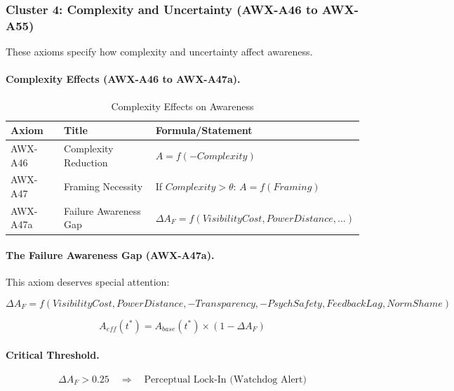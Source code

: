 \subsubsection{Cluster 4: Complexity and Uncertainty (AWX-A46 to AWX-A55)}

These axioms specify how complexity and uncertainty affect awareness.

\paragraph{Complexity Effects (AWX-A46 to AWX-A47a).}

\begin{table}[htbp]
\centering
\caption{Complexity Effects on Awareness}
\label{tab:complexity-effects}
\renewcommand{\arraystretch}{1.3}
\begin{tabular}{@{}llp{5.5cm}@{}}
\toprule
\textbf{Axiom} & \textbf{Title} & \textbf{Formula/Statement} \\
\midrule
AWX-A46 & Complexity Reduction & $A = f(-Complexity)$ \\
AWX-A47 & Framing Necessity & If $Complexity > \theta$: $A = f(Framing)$ \\
AWX-A47a & Failure Awareness Gap & $\Delta A_F = f(VisibilityCost, PowerDistance, ...)$ \\
\bottomrule
\end{tabular}
\end{table}

\paragraph{The Failure Awareness Gap (AWX-A47a).}
This axiom deserves special attention:

\begin{equation}
\Delta A_F = f(VisibilityCost, PowerDistance, -Transparency, -PsychSafety, FeedbackLag, NormShame)
\end{equation}

\begin{equation}
A_{eff}(t^*) = A_{base}(t^*) \times (1 - \Delta A_F)
\end{equation}

\paragraph{Critical Threshold.}
\begin{equation}
\Delta A_F > 0.25 \quad \Rightarrow \quad \text{Perceptual Lock-In (Watchdog Alert)}
\end{equation}

